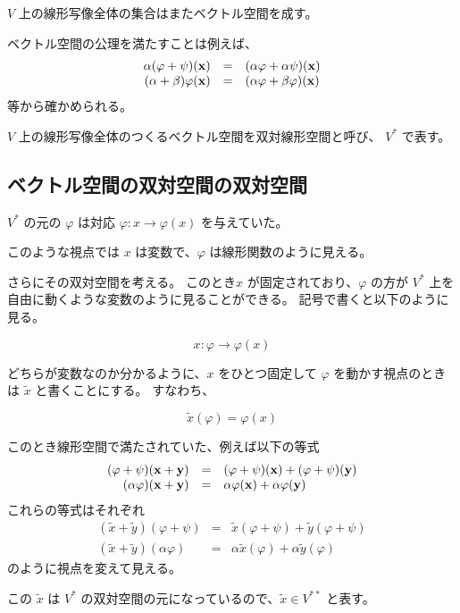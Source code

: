 \documentclass[uplatex,a4j,12pt,dvipdfmx]{jsarticle}
\begin{document}
$V$ 上の線形写像全体の集合はまたベクトル空間を成す。

ベクトル空間の公理を満たすことは例えば、
\[
	\begin{array}{rcl}
		\alpha (\varphi + \psi) (\bf{x} ) & = & ( \alpha \varphi + \alpha \psi) (\bf{x} )
		\\
		(\alpha + \beta) \varphi (\bf{x}) & = & (\alpha \varphi + \beta \varphi) (\bf{x})
	\end{array}
\]
等から確かめられる。

$V$ 上の線形写像全体のつくるベクトル空間を双対線形空間と呼び、 $V^{*}$ で表す。

\subsection{ベクトル空間の双対空間の双対空間}

$V^{*}$ の元の $\varphi$ は対応 $\varphi : x \to \varphi(x)$ を与えていた。

このような視点では $x$ は変数で、$\varphi$ は線形関数のように見える。

さらにその双対空間を考える。
このとき$x$ が固定されており、$\varphi$ の方が $V^{*}$ 上を自由に動くような変数のように見ることができる。
記号で書くと以下のように見る。

$$
	x : \varphi \to \varphi(x)
$$

どちらが変数なのか分かるように、$x$ をひとつ固定して $\varphi$ を動かす視点のときは $\tilde{x}$ と書くことにする。
すなわち、

$$
	\tilde{x}(\varphi) = \varphi(x)
$$

このとき線形空間で満たされていた、例えば以下の等式
\[
	\begin{array}{rcl}
		(\varphi + \psi) (\bf{x} + \bf{y})
		 & = &
		(\varphi + \psi) (\bf{x}) + (\varphi + \psi) (\bf{y})
		\\
		(\alpha \varphi) (\bf{x} + \bf{y})
		 & = &
		\alpha \varphi (\bf{x}) + \alpha \varphi (\bf{y})
	\end{array}
\]
これらの等式はそれぞれ
\[
	\begin{array}{rcl}
		(\tilde{x} + \tilde{y} ) (\varphi + \psi)
		 & = &
		\tilde{x} (\varphi + \psi)  + \tilde{y} (\varphi + \psi)
		\\
		(\tilde{x} + \tilde{y} ) (\alpha \varphi)
		 & = &
		\alpha \tilde{x} (\varphi) + \alpha \tilde{y} (\varphi)
	\end{array}
\]
のように視点を変えて見える。

この $\tilde{x}$ は $V^{*}$ の双対空間の元になっているので、$\tilde{x} \in V^{**}$ と表す。
\end{document}
